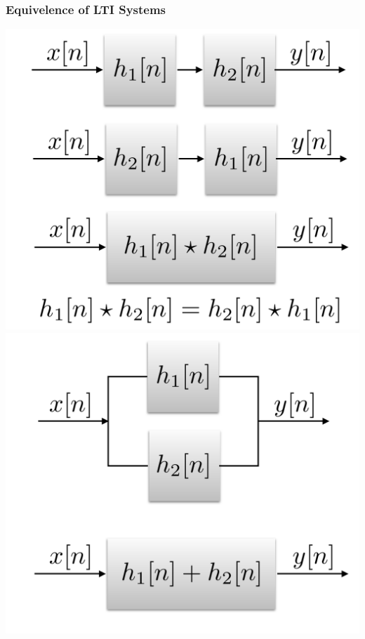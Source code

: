 \documentclass[mathserif,9pt,handout]{beamer}
\begin{document}
\begin{frame}\frametitle{Equivelence of LTI Systems}\small
  \begin{center}
    \includegraphics[height=.45\textheight]{lti_sys_00.pdf} \hspace{2em}
    \includegraphics[height=.45\textheight]{lti_sys_01.pdf}
  \end{center}
\end{frame}
\end{document}
